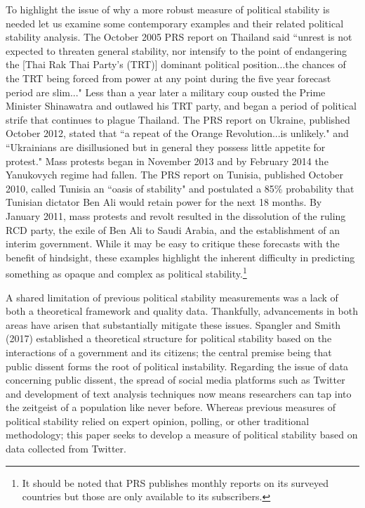 \documentclass[12pt]{article}
\begin{document}
\begin{spacing}{1.5}
To highlight the issue of why a more robust measure of political stability is needed let us examine some contemporary examples and their related political stability analysis. The October 2005 PRS report on Thailand said ``unrest is not expected to threaten general stability, nor intensify to the point of endangering the [Thai Rak Thai Party's (TRT)] dominant political position...the chances of the TRT being forced from power at any point during the five year forecast period are slim..." Less than a year later a military coup ousted the Prime Minister Shinawatra and outlawed his TRT party, and began a period of political strife that continues to plague Thailand. The PRS report on Ukraine, published October 2012, stated that ``a repeat of the Orange Revolution...is unlikely." and ``Ukrainians are disillusioned but in general they possess little appetite for protest." Mass protests began in November 2013 and by February 2014 the Yanukovych regime had fallen. The PRS report on Tunisia, published October 2010, called Tunisia an ``oasis of stability" and postulated a 85\% probability that Tunisian dictator Ben Ali would retain power for the next 18 months. By January 2011, mass protests and revolt resulted in the dissolution of the ruling RCD party, the exile of Ben Ali to Saudi Arabia, and the establishment of an interim government. While it may be easy to critique these forecasts with the benefit of hindsight, these examples highlight the inherent difficulty in predicting something as opaque and complex as political stability.\footnote{It should be noted that PRS publishes monthly reports on its surveyed countries but those are only available to its subscribers.} 

A shared limitation of previous political stability measurements was a lack of both a theoretical framework and quality data. Thankfully, advancements in both areas have arisen that substantially mitigate these issues. Spangler and Smith (2017) established a theoretical structure for political stability based on the interactions of a government and its citizens; the central premise being that public dissent forms the root of political instability. Regarding the issue of data concerning public dissent, the spread of social media platforms such as Twitter and development of text analysis techniques now means researchers can tap into the zeitgeist of a population like never before. Whereas previous measures of political stability relied on expert opinion, polling, or other traditional methodology; this paper seeks to develop a measure of political stability based on data collected from Twitter. 


\end{spacing}
\end{document}
